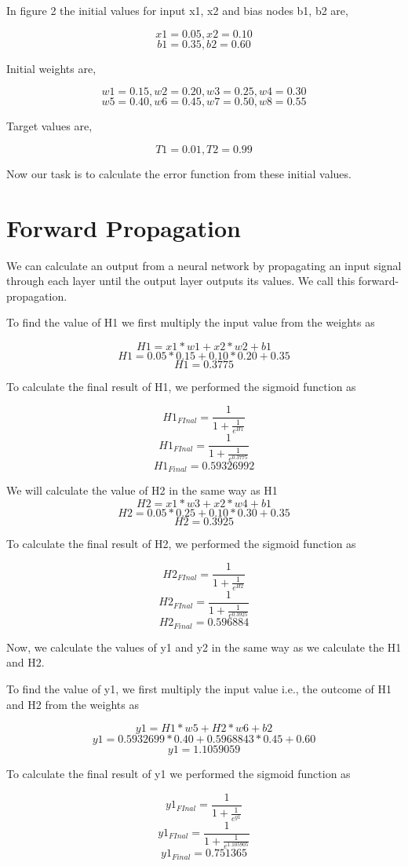 \documentclass[12pt]{article}
\begin{document}
In figure 2 the initial values for input x1, x2 and bias nodes b1, b2 are,

\[x1 = 0.05, x2 = 0.10\]
\[b1 = 0.35, b2 = 0.60\]

Initial weights are,

\[w1 = 0.15, w2 = 0.20, w3 = 0.25, w4 = 0.30\]
\[w5 = 0.40, w6 = 0.45, w7 = 0.50, w8 = 0.55\]

Target values are,

\[T1 = 0.01, T2 = 0.99\]

Now our task is to calculate the error function from these initial values.

\section{Forward Propagation}

We can calculate an output from a neural network by propagating an input signal through each layer until the output layer outputs its values. We call this forward-propagation.




To find the value of H1 we first multiply the input value from the weights as

\[H1=x1*w1+x2*w2+b1\]
\[H1=0.05*0.15+0.10*0.20+0.35\]
\[H1=0.3775\]


To calculate the final result of H1, we performed the sigmoid function as

\[H1_{FInal}=\frac{1}{1+\frac{1}{e^{H1}}}\]
\[H1_{FInal}=\frac{1}{1+\frac{1}{e^{0.3775}}}\]
\[H1_{Final}=0.59326992\]


We will calculate the value of H2 in the same way as H1
\[H2=x1*w3+x2*w4+b1\]
\[H2=0.05*0.25+0.10*0.30+0.35\]
\[H2=0.3925\]


To calculate the final result of H2, we performed the sigmoid function as

\[H2_{FInal}=\frac{1}{1+\frac{1}{e^{H2}}}\]
\[H2_{FInal}=\frac{1}{1+\frac{1}{e^{0.3925}}}\]
\[H2_{Final}=0.596884\]


Now, we calculate the values of y1 and y2 in the same way as we calculate the H1 and H2.

To find the value of y1, we first multiply the input value i.e., the outcome of H1 and H2 from the weights as

\[y1=H1*w5+H2*w6+b2\]
\[y1=0.5932699*0.40+0.5968843*0.45+0.60\]
\[y1=1.1059059\]

To calculate the final result of y1 we performed the sigmoid function as

\[y1_{FInal}=\frac{1}{1+\frac{1}{e^{y1}}}\]
\[y1_{FInal}=\frac{1}{1+\frac{1}{e^{1.105905}}}\]
\[y1_{Final}=0.751365\]
\end{document}
